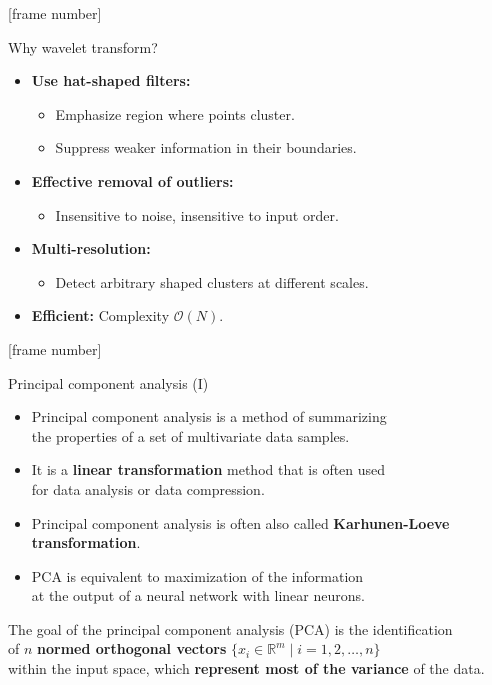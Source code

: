 \documentclass[aspectratio=169,t]{beamer}
\begin{document}
  {
    [frame number]
    \begin{frame}{Why wavelet transform?}
    \begin{itemize}
      \item \textbf{Use hat-shaped filters:}
      \begin{itemize}
        \item Emphasize region where points cluster.
        \item Suppress weaker information in their boundaries.
      \end{itemize}
      \item \textbf{Effective removal of outliers:}
      \begin{itemize}
        \item Insensitive to noise, insensitive to input order.
      \end{itemize}
      \item \textbf{Multi-resolution:}
      \begin{itemize}
        \item Detect arbitrary shaped clusters at different scales.
      \end{itemize}
      \item \textbf{Efficient:} Complexity $\mathcal{O}(N)$.
    \end{itemize}
    \end{frame}
  }

  {
    [frame number]
    \begin{frame}{Principal component analysis (I)}
    \begin{itemize}
      \item Principal component analysis is a method of summarizing \\
      the properties of a set of multivariate data samples.
      \item It is a \textbf{linear transformation} method that is often used \\ for data analysis or data compression.
      \item Principal component analysis is often also called \textbf{Karhunen-Loeve transformation}.
      \item PCA is equivalent to maximization of the information \\ at the output of a neural network with linear neurons.
    \end{itemize}
    \vspace{0.5cm}
    The goal of the principal component analysis (PCA) is the identification \\
    of $n$ \textbf{normed orthogonal vectors} $\{x_i \in \mathbb{R}^m \; \vert \; i = 1,2, \ldots,n \}$ \\
    within the input space, which \textbf{represent most of the variance} of the data.
    \end{frame}
  }
\end{document}
